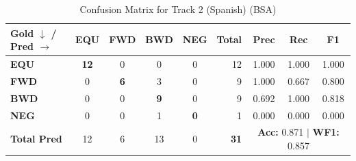 \begin{table}[ht]
\centering
\small
\begin{tabular}{l|cccc|r|ccc}
\toprule
\textbf{Gold $\downarrow$ / Pred $\rightarrow$} & \textbf{EQU} & \textbf{FWD} & \textbf{BWD} & \textbf{NEG} & \textbf{Total} & \textbf{Prec} & \textbf{Rec} & \textbf{F1} \\
\midrule
\textbf{EQU} & \textbf{12} & 0 & 0 & 0 & 12 & 1.000 & 1.000 & 1.000 \\
\textbf{FWD} & 0 & \textbf{6} & 3 & 0 & 9 & 1.000 & 0.667 & 0.800 \\
\textbf{BWD} & 0 & 0 & \textbf{9} & 0 & 9 & 0.692 & 1.000 & 0.818 \\
\textbf{NEG} & 0 & 0 & 1 & \textbf{0} & 1 & 0.000 & 0.000 & 0.000 \\
\midrule
\textbf{Total Pred} & 12 & 6 & 13 & 0 & \textbf{31} & \multicolumn{3}{c}{\textbf{Acc:} 0.871 $\mid$ \textbf{WF1:} 0.857} \\
\bottomrule
\end{tabular}
\caption{Confusion Matrix for Track 2 (Spanish) (BSA)}
\label{tab:confusion_matrix}
\end{table}